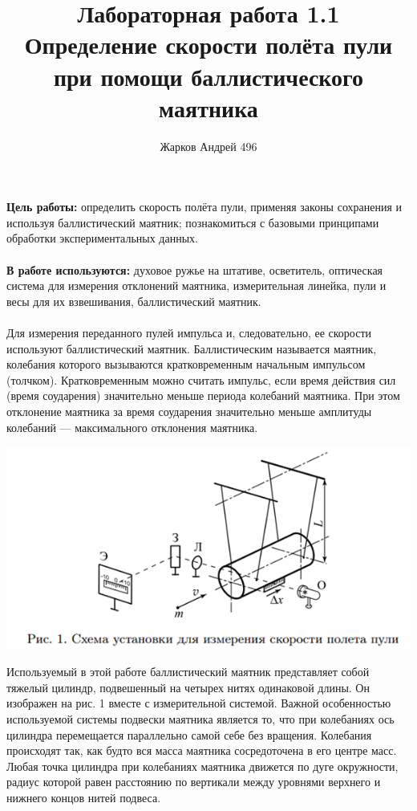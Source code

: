 \documentclass[12pt]{article}
\begin{document}
    \author {Жарков Андрей 496}
    \title {Лабораторная работа 1.1 \\  Определение скорости полёта пули при помощи баллистического маятника}
    \maketitle{}
    
    \indent
    \textbf{Цель работы:} определить скорость полёта пули, применяя законы
    сохранения и используя баллистический маятник; познакомиться с
    базовыми принципами обработки экспериментальных данных.
    \\ \\
    \indent
    \textbf{В работе используются:} духовое ружье на штативе, осветитель, оптическая система для измерения отклонений маятника, измерительная линейка, пули и весы для их взвешивания, баллистический маятник.
    \\ \\
    
    Для измерения переданного пулей импульса и, следовательно, ее скорости используют баллистический маятник. Баллистическим называется маятник, колебания которого вызываются кратковременным начальным импульсом (толчком). Кратковременным можно считать импульс,
    если время действия сил (время соударения) значительно меньше периода колебаний маятника. При этом отклонение маятника за время
    соударения значительно меньше амплитуды колебаний — максимального отклонения маятника. \\
    
    \begin{center} 
    	\includegraphics[width=5.5in]{lab1_1.png}
    \end{center}
    
    
    
    Используемый в этой работе баллистический маятник представляет
    собой тяжелый цилиндр, подвешенный на четырех нитях одинаковой
    длины. Он изображен на рис. 1 вместе с измерительной системой. Важной особенностью используемой системы подвески маятника является
    то, что при колебаниях ось цилиндра перемещается параллельно самой
    себе без вращения. Колебания происходят так, как будто вся масса маятника сосредоточена в его центре масс. Любая точка цилиндра при
    колебаниях маятника движется по дуге окружности, радиус которой
    равен расстоянию по вертикали между уровнями верхнего и нижнего
    концов нитей подвеса. \\
    
\end{document}
